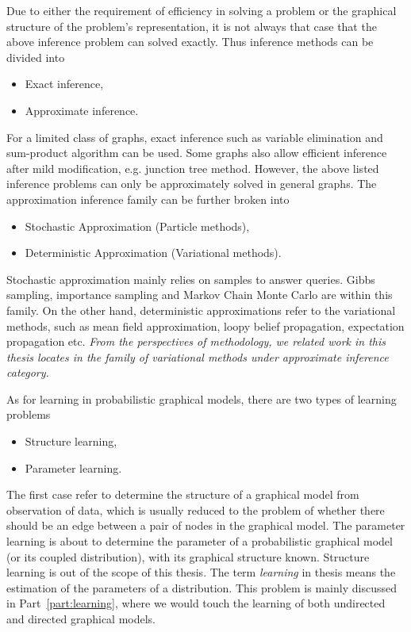 Due to either the requirement of efficiency in solving a problem or the graphical structure of the problem's representation, it is not always that case that the above inference problem can solved exactly. Thus inference methods can be divided into
\begin{itemize}
\item Exact inference,
\item Approximate inference.
\end{itemize}
For a limited class of graphs, exact inference such as variable elimination and sum-product algorithm can be used. Some graphs also allow efficient inference after mild modification, e.g. junction tree method. However, the above listed inference problems can only be approximately solved in general graphs. The approximation inference family can be further broken into
\begin{itemize}
\item Stochastic Approximation (Particle methods),
\item Deterministic Approximation (Variational methods).
\end{itemize}
Stochastic approximation mainly relies on samples to answer queries. Gibbs sampling, importance sampling and Markov Chain Monte Carlo are within this family. On the other hand, deterministic approximations refer to the variational methods, such as mean field approximation, loopy belief propagation, expectation propagation etc. \textit{From the perspectives of methodology, we related work in this thesis locates in the family of variational methods under approximate inference category.}


As for learning in probabilistic graphical models, there are two types of learning problems
\begin{itemize}
\item Structure learning,
\item Parameter learning.
\end{itemize}
The first case refer to determine the structure of a graphical model from observation of data, which is usually reduced to the problem of whether there should be an edge between a pair of nodes in the graphical model. The parameter learning is about to determine the parameter of a probabilistic graphical model (or its coupled distribution), with its graphical structure known. Structure learning is out of the scope of this thesis. The term \textit{learning} in thesis means the estimation of the parameters of a distribution. This problem is mainly discussed in Part~\ref{part:learning}, where we would touch the learning of both undirected and directed graphical models. 


